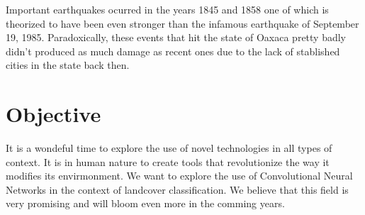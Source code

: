 Important earthquakes ocurred in the years 1845 and 1858 one of which is theorized to have been even stronger than the infamous earthquake of September 19, 1985. Paradoxically, these events that hit the state of Oaxaca pretty badly didn't produced as much damage as recent ones due to the lack of stablished cities in the state back then.

\begin{figure}[h]
  \begin{center}
  \end{center}
\end{figure}


\section{Objective}

It is a wondeful time to explore the use of novel technologies in all types of context. It is in human nature to create tools that revolutionize the way it modifies its envirmonment. We want to explore the use of Convolutional Neural Networks in the context of landcover classification. We believe that this field is very promising and will bloom even more in the comming years. 

